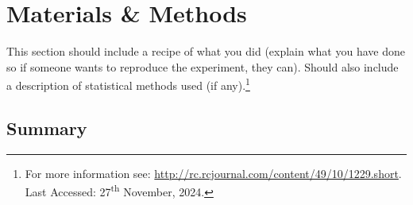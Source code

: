 \chapter{Materials \& Methods}

This section should include a recipe of what you did (explain what you have done so if someone wants to reproduce the experiment, they can). Should also include a description of statistical methods used (if any).\footnote{For more information see: \url{http://rc.rcjournal.com/content/49/10/1229.short}. Last Accessed: 27\textsuperscript{th} November, 2024.}

\blindtext

\section{Summary}
\blindtext